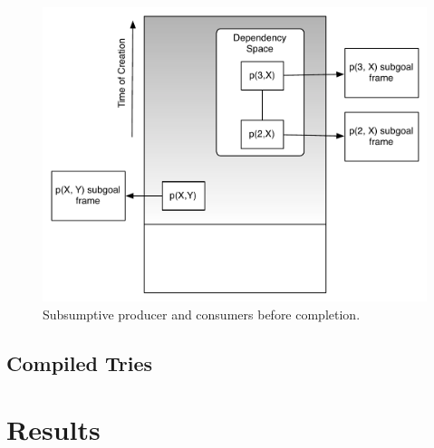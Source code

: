 \begin{figure}[H]
  \centering
    \includegraphics[scale=0.6]{completion_space.pdf}
  \caption{Subsumptive producer and consumers before completion.}
  \label{fig:completion_space}
\end{figure}

\subsection{Compiled Tries}

\section{Results}
